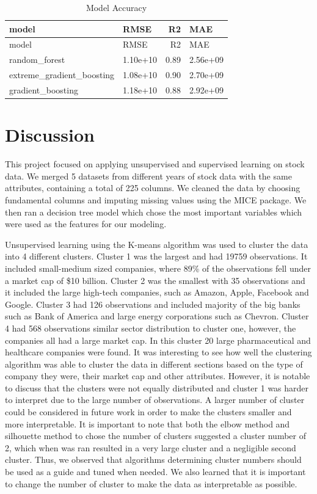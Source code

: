 \documentclass[11pt,]{article}
\begin{document}
\begin{longtable}[]{@{}llrl@{}}
\caption{Model Accuracy}\tabularnewline
\toprule
model & RMSE & R2 & MAE\tabularnewline
\midrule
\endfirsthead
\toprule
model & RMSE & R2 & MAE\tabularnewline
\midrule
\endhead
random\_forest & 1.10e+10 & 0.89 & 2.56e+09\tabularnewline
extreme\_gradient\_boosting & 1.08e+10 & 0.90 & 2.70e+09\tabularnewline
gradient\_boosting & 1.18e+10 & 0.88 & 2.92e+09\tabularnewline
\bottomrule
\end{longtable}

\hypertarget{discussion}{%
\section{Discussion}\label{discussion}}

This project focused on applying unsupervised and supervised learning on
stock data. We merged 5 datasets from different years of stock data with
the same attributes, containing a total of 225 columns. We cleaned the
data by choosing fundamental columns and imputing missing values using
the MICE package. We then ran a decision tree model which chose the most
important variables which were used as the features for our modeling.

Unsupervised learning using the K-means algorithm was used to cluster
the data into 4 different clusters. Cluster 1 was the largest and had
19759 observations. It included small-medium sized companies, where 89\%
of the observations fell under a market cap of \$10 billion. Cluster 2
was the smallest with 35 observations and it included the large
high-tech companies, such as Amazon, Apple, Facebook and Google. Cluster
3 had 126 observations and included majority of the big banks such as
Bank of America and large energy corporations such as Chevron. Cluster 4
had 568 observations similar sector distribution to cluster one,
however, the companies all had a large market cap. In this cluster 20
large pharmaceutical and healthcare companies were found. It was
interesting to see how well the clustering algorithm was able to cluster
the data in different sections based on the type of company they were,
their market cap and other attributes. However, it is notable to discuss
that the clusters were not equally distributed and cluster 1 was harder
to interpret due to the large number of observations. A larger number of
cluster could be considered in future work in order to make the clusters
smaller and more interpretable. It is important to note that both the
elbow method and silhouette method to chose the number of clusters
suggested a cluster number of 2, which when was ran resulted in a very
large cluster and a negligible second cluster. Thus, we observed that
algorithms determining cluster numbers should be used as a guide and
tuned when needed. We also learned that it is important to change the
number of cluster to make the data as interpretable as possible.
\end{document}
